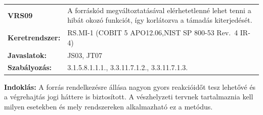 \documentclass[12pt,magyar,a4paper,oneside]{scrreprt}
\begin{document}
\begin{longtable}[]{@{}ll@{}}
\toprule
\endhead
\begin{minipage}[t]{0.16\columnwidth}\raggedright
\textbf{VRS09}\strut
\end{minipage} & \begin{minipage}[t]{0.79\columnwidth}\raggedright
A forráskód megváltoztatásával elérhetetlenné lehet tenni a hibát okozó
funkciót, így korlátozva a támadás kiterjedését.\strut
\end{minipage}\tabularnewline
\begin{minipage}[t]{0.16\columnwidth}\raggedright
\textbf{Keretrendszer:}\strut
\end{minipage} & \begin{minipage}[t]{0.79\columnwidth}\raggedright
RS.MI-1 (COBIT 5 APO12.06,NIST SP 800-53 Rev.~4 IR-4)\strut
\end{minipage}\tabularnewline
\begin{minipage}[t]{0.16\columnwidth}\raggedright
\textbf{Javaslatok:}\strut
\end{minipage} & \begin{minipage}[t]{0.79\columnwidth}\raggedright
JS03, JT07\strut
\end{minipage}\tabularnewline
\begin{minipage}[t]{0.16\columnwidth}\raggedright
\textbf{Szabályozás:}\strut
\end{minipage} & \begin{minipage}[t]{0.79\columnwidth}\raggedright
3.1.5.8.1.1.1., 3.3.11.7.1.2., 3.3.11.7.1.3.\strut
\end{minipage}\tabularnewline
\bottomrule
\end{longtable}

\textbf{Indoklás: } A forrás rendelkezésre állása nagyon gyors
reakcióidőt tesz lehetővé és a végrehajtás jogi háttere is biztosított.
A vészhelyzeti tervnek tartalmaznia kell milyen esetekben és mely
rendszereken alkalmazható ez a metódus.
\end{document}
